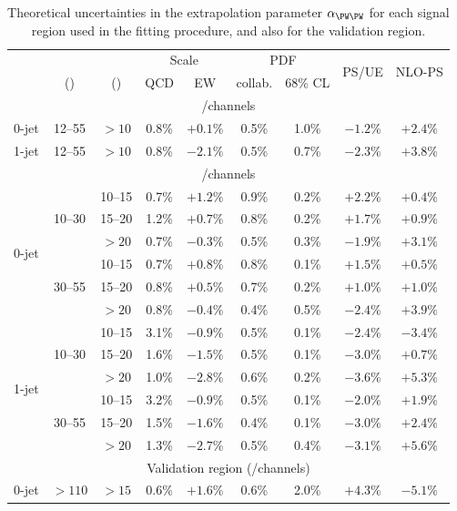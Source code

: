 \begin{table}[p]
	\centering
	\begin{tabular}{ccc|cccccc}
		\toprule
		& \mll & \ptsubleadlep & \multicolumn{2}{c}{Scale} & \multicolumn{2}{c}{PDF} & \multirow{2}{*}{PS/UE} & \multirow{2}{*}{NLO-PS} \\
		& (\GeV) & (\GeV) & QCD & EW & collab. & 68\% CL & & \\
		\midrule
		\multicolumn{9}{c}{\eech/\mmch channels} \\
		\midrule
		0-jet & 12--55 & $>10$ & 0.8\% & $+0.1\%$ & 0.5\% & 1.0\% & $-1.2\%$ & $+2.4\%$ \\
		1-jet & 12--55 & $>10$ & 0.8\% & $-2.1\%$ & 0.5\% & 0.7\% & $-2.3\%$ & $+3.8\%$ \\
		\midrule
		\multicolumn{9}{c}{\emch/\mech channels} \\
		\midrule
		\multirow{6}{*}{0-jet}
		& \multirow{3}{*}{10--30}
	    &  10--15 & 0.7\% & $+1.2\%$ & 0.9\% & 0.2\% & $+2.2\%$ & $+0.4\%$ \\
		&& 15--20 & 1.2\% & $+0.7\%$ & 0.8\% & 0.2\% & $+1.7\%$ & $+0.9\%$ \\
		&&  $>20$ & 0.7\% & $-0.3\%$ & 0.5\% & 0.3\% & $-1.9\%$ & $+3.1\%$ \\
		\cmidrule(lr){2-9}
		& \multirow{3}{*}{30--55}
		&  10--15 & 0.7\% & $+0.8\%$ & 0.8\% & 0.1\% & $+1.5\%$ & $+0.5\%$ \\
		&& 15--20 & 0.8\% & $+0.5\%$ & 0.7\% & 0.2\% & $+1.0\%$ & $+1.0\%$ \\
		&&  $>20$ & 0.8\% & $-0.4\%$ & 0.4\% & 0.5\% & $-2.4\%$ & $+3.9\%$ \\
		\cmidrule(lr){1-9}
		\multirow{6}{*}{1-jet}
		& \multirow{3}{*}{10--30}
	    &  10--15 & 3.1\% & $-0.9\%$ & 0.5\% & 0.1\% & $-2.4\%$ & $-3.4\%$ \\
		&& 15--20 & 1.6\% & $-1.5\%$ & 0.5\% & 0.1\% & $-3.0\%$ & $+0.7\%$ \\
		&&  $>20$ & 1.0\% & $-2.8\%$ & 0.6\% & 0.2\% & $-3.6\%$ & $+5.3\%$ \\
		\cmidrule(lr){2-9}
		& \multirow{3}{*}{30--55}
		&  10--15 & 3.2\% & $-0.9\%$ & 0.5\% & 0.1\% & $-2.0\%$ & $+1.9\%$ \\
		&& 15--20 & 1.5\% & $-1.6\%$ & 0.4\% & 0.1\% & $-3.0\%$ & $+2.4\%$ \\
		&&  $>20$ & 1.3\% & $-2.7\%$ & 0.5\% & 0.4\% & $-3.1\%$ & $+5.6\%$ \\
		\midrule
		\multicolumn{9}{c}{Validation region (\emch/\mech channels)} \\
		\midrule
		0-jet & $>110$ & $>15$ & 0.6\% & $+1.6\%$ & 0.6\% & 2.0\% & $+4.3\%$ & $-5.1\%$ \\
		\bottomrule
	\end{tabular}
	\caption{Theoretical uncertainties in the \WW extrapolation parameter $\alpha_{\WW}$ 
	for each signal region used in the fitting procedure, and also for the validation 
	region.}
	\label{tab:ww_bkg:alpha_unc}
\end{table}




